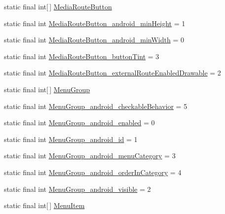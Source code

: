 \begin{CompactItemize}
\item 
static final int\mbox{[}$\,$\mbox{]} \hyperlink{classandroid_1_1support_1_1v4_1_1_r_1_1styleable_b8373fc29d9d3ae7c46174f3caf39215}{MediaRouteButton}
\item 
static final int \hyperlink{classandroid_1_1support_1_1v4_1_1_r_1_1styleable_232cbfb4c13b07cb6d29fd924cdb6b61}{MediaRouteButton\_\-android\_\-minHeight} = 1
\item 
static final int \hyperlink{classandroid_1_1support_1_1v4_1_1_r_1_1styleable_00278b194a19a6476c38e50dde31642c}{MediaRouteButton\_\-android\_\-minWidth} = 0
\item 
static final int \hyperlink{classandroid_1_1support_1_1v4_1_1_r_1_1styleable_c0211c76c5d560a47ec498d31003f0b6}{MediaRouteButton\_\-buttonTint} = 3
\item 
static final int \hyperlink{classandroid_1_1support_1_1v4_1_1_r_1_1styleable_8ae8e1423dabf0e93738248e95b25fd8}{MediaRouteButton\_\-externalRouteEnabledDrawable} = 2
\item 
static final int\mbox{[}$\,$\mbox{]} \hyperlink{classandroid_1_1support_1_1v4_1_1_r_1_1styleable_ba730c6d04433f7e2cb2ad1dd3b251a3}{MenuGroup}
\item 
static final int \hyperlink{classandroid_1_1support_1_1v4_1_1_r_1_1styleable_126bac3dad19a00fdfbdd269f2f7d49d}{MenuGroup\_\-android\_\-checkableBehavior} = 5
\item 
static final int \hyperlink{classandroid_1_1support_1_1v4_1_1_r_1_1styleable_8febcff2013f06843b34c8367e07691b}{MenuGroup\_\-android\_\-enabled} = 0
\item 
static final int \hyperlink{classandroid_1_1support_1_1v4_1_1_r_1_1styleable_228a366c5643772debec90926b752e4b}{MenuGroup\_\-android\_\-id} = 1
\item 
static final int \hyperlink{classandroid_1_1support_1_1v4_1_1_r_1_1styleable_b070cff86293dacf98e20c220a8e0af0}{MenuGroup\_\-android\_\-menuCategory} = 3
\item 
static final int \hyperlink{classandroid_1_1support_1_1v4_1_1_r_1_1styleable_a2bd4e8b65f7ef482c13b6325dcc3878}{MenuGroup\_\-android\_\-orderInCategory} = 4
\item 
static final int \hyperlink{classandroid_1_1support_1_1v4_1_1_r_1_1styleable_e6b2370a519554c52dd6d1cfe33eccd4}{MenuGroup\_\-android\_\-visible} = 2
\item 
static final int\mbox{[}$\,$\mbox{]} \hyperlink{classandroid_1_1support_1_1v4_1_1_r_1_1styleable_05493a7eeaa2bff09c4fbacbfb671ccc}{MenuItem}
\item 

\end{CompactItemize}
